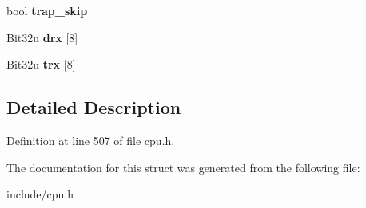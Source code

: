 \begin{DoxyCompactItemize}
\item 
\hypertarget{structCPUBlock_ad260beedb05a65ac8494b9d8f38010c2}{bool {\bfseries trap\-\_\-skip}}\label{structCPUBlock_ad260beedb05a65ac8494b9d8f38010c2}

\item 
\hypertarget{structCPUBlock_a58abd61bc639fbb9992d8715bb3ed6ac}{Bit32u {\bfseries drx} \mbox{[}8\mbox{]}}\label{structCPUBlock_a58abd61bc639fbb9992d8715bb3ed6ac}

\item 
\hypertarget{structCPUBlock_a8dacafb431cbcd0b7632b92f1999244a}{Bit32u {\bfseries trx} \mbox{[}8\mbox{]}}\label{structCPUBlock_a8dacafb431cbcd0b7632b92f1999244a}

\end{DoxyCompactItemize}


\subsection{Detailed Description}


Definition at line 507 of file cpu.\-h.



The documentation for this struct was generated from the following file\-:\begin{DoxyCompactItemize}
\item 
include/cpu.\-h\end{DoxyCompactItemize}

